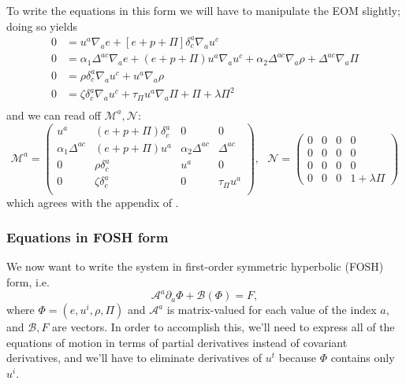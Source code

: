 \documentclass[12pt]{article}
\numberwithin{equation}{section}
\begin{document}
To write the equations in this form we will have to manipulate the EOM slightly; doing so yields
\begin{equation}
\begin{aligned}
0 &= u^a \nabla_{a} e + [e + p + \Pi] \delta^{a}_{c} \nabla_{a} u^c \\
0 &= \alpha_1 \Delta^{ac} \nabla_a e + (e + p + \Pi) u^a \nabla_{a} u^c + \alpha_2 \Delta^{ac} \nabla_a \rho + \Delta^{ac} \nabla_{a} \Pi \\
0 &= \rho \delta^{a}_{c} \nabla_{a} u^c + u^a \nabla_{a} \rho \\
0 &= \zeta \delta^{a}_{c} \nabla_a u^c + \tau_{\Pi} u^a \nabla_a \Pi + \Pi + \lambda \Pi^2 \\
\end{aligned}
\end{equation}
and we can read off $\mathcal{M}^{a}, \mathcal{N}$:
\begin{equation}
\mathcal{M}^{a} =
\begin{pmatrix}
u^a & (e+p+\Pi) \delta^{a}_{c} & 0 & 0 \\
\alpha_1 \Delta^{ac} & (e+p+\Pi) u^a & \alpha_2 \Delta^{ac} & \Delta^{ac} \\
0 & \rho \delta^{a}_{c} & u^a & 0 \\
0 & \zeta \delta^{a}_{c} & 0 & \tau_{\Pi} u^a \\
\end{pmatrix},~~~
\mathcal{N} =
\begin{pmatrix}
0 & 0 & 0 & 0 \\
0 & 0 & 0 & 0 \\
0 & 0 & 0 & 0 \\
0 & 0 & 0 & 1 + \lambda \Pi
\end{pmatrix}
\end{equation}
which agrees with the appendix of \cite{Bemfica19}.


\subsubsection{Equations in FOSH form}

We now want to write the system in first-order symmetric hyperbolic (FOSH) form, i.e.
\begin{equation}
\mathcal{A}^{a} \partial_{a} \Phi + \mathcal{B}(\Phi) = F,
\end{equation}
where $\Phi = (e, u^i, \rho , \Pi)$ and $\mathcal{A}^a$ is matrix-valued for each value of the index $a$, and $\mathcal{B}, F$ are vectors.
In order to accomplish this, we'll need to express all of the equations of motion in terms of partial derivatives instead of covariant derivatives, and we'll have to eliminate derivatives of $u^t$ because $\Phi$ contains only $u^i$.
\end{document}
